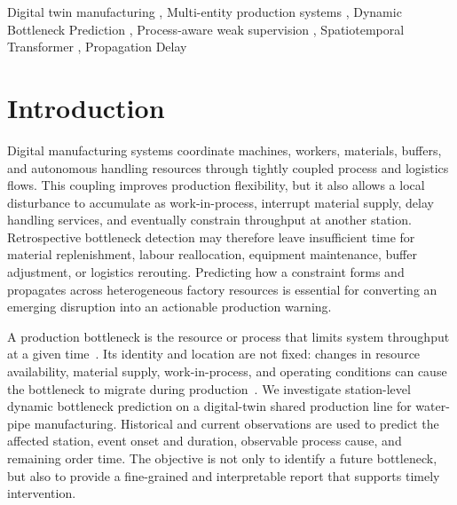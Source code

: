 \documentclass[a4paper,fleqn]{cas-dc}
\begin{document}
\begin{keywords}
Digital twin manufacturing \sep
Multi-entity production systems \sep
Dynamic Bottleneck Prediction \sep
Process-aware weak supervision \sep
Spatiotemporal Transformer \sep
Propagation Delay
\end{keywords}

\begin{NoHyper}
\maketitle
\end{NoHyper}

\section{Introduction} \label{sec:intro}

Digital manufacturing systems coordinate machines, workers, materials, buffers, and autonomous handling resources through tightly coupled process and logistics flows. This coupling improves production flexibility, but it also allows a local disturbance to accumulate as work-in-process, interrupt material supply, delay handling services, and eventually constrain throughput at another station. Retrospective bottleneck detection may therefore leave insufficient time for material replenishment, labour reallocation, equipment maintenance, buffer adjustment, or logistics rerouting. Predicting how a constraint forms and propagates across heterogeneous factory resources is essential for converting an emerging disruption into an actionable production warning.


A production bottleneck is the resource or process that limits system throughput at a given time~\cite{roser2001practical,subramaniyan2023throughput,tang2024comprehensive}. Its identity and location are not fixed: changes in resource availability, material supply, work-in-process, and operating conditions can cause the bottleneck to migrate during production~\cite{roser2002shifting,lai2021data}. We investigate station-level dynamic bottleneck prediction on a digital-twin shared production line for water-pipe manufacturing. Historical and current observations are used to predict the affected station, event onset and duration, observable process cause, and remaining order time. The objective is not only to identify a future bottleneck, but also to provide a fine-grained and interpretable report that supports timely intervention.
\end{document}
